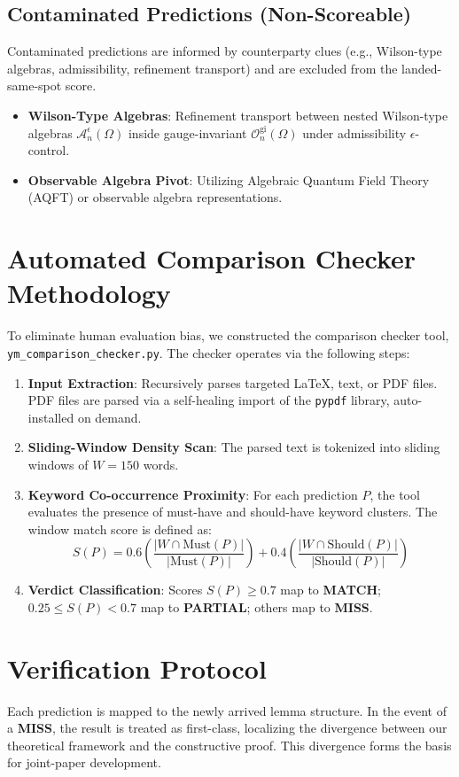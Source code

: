 \documentclass[11pt,a4paper]{article}
\begin{document}
\subsection{Contaminated Predictions (Non-Scoreable)}
Contaminated predictions are informed by counterparty clues (e.g., Wilson-type algebras, admissibility, refinement transport) and are excluded from the landed-same-spot score.

\begin{itemize}
    \item[\textbf{X1}] \textbf{Wilson-Type Algebras}: Refinement transport between nested Wilson-type algebras $\mathcal{A}_n^{\epsilon}(\Omega)$ inside gauge-invariant $\mathcal{O}_n^{\text{gi}}(\Omega)$ under admissibility $\epsilon$-control.
    \item[\textbf{X2}] \textbf{Observable Algebra Pivot}: Utilizing Algebraic Quantum Field Theory (AQFT) or observable algebra representations.
\end{itemize}

\section{Automated Comparison Checker Methodology}
To eliminate human evaluation bias, we constructed the comparison checker tool, \texttt{ym\_comparison\_checker.py}. The checker operates via the following steps:
\begin{enumerate}
    \item \textbf{Input Extraction}: Recursively parses targeted LaTeX, text, or PDF files. PDF files are parsed via a self-healing import of the \texttt{pypdf} library, auto-installed on demand.
    \item \textbf{Sliding-Window Density Scan}: The parsed text is tokenized into sliding windows of $W = 150$ words.
    \item \textbf{Keyword Co-occurrence Proximity}: For each prediction $P$, the tool evaluates the presence of must-have and should-have keyword clusters. The window match score is defined as:
    \begin{equation}
        S(P) = 0.6 \left( \frac{|W \cap \text{Must}(P)|}{|\text{Must}(P)|} \right) + 0.4 \left( \frac{|W \cap \text{Should}(P)|}{|\text{Should}(P)|} \right)
    \end{equation}
    \item \textbf{Verdict Classification}: Scores $S(P) \ge 0.7$ map to \textbf{MATCH}; $0.25 \le S(P) < 0.7$ map to \textbf{PARTIAL}; others map to \textbf{MISS}.
\end{enumerate}

\section{Verification Protocol}
Each prediction is mapped to the newly arrived lemma structure. In the event of a \textbf{MISS}, the result is treated as first-class, localizing the divergence between our theoretical framework and the constructive proof. This divergence forms the basis for joint-paper development.
\end{document}
